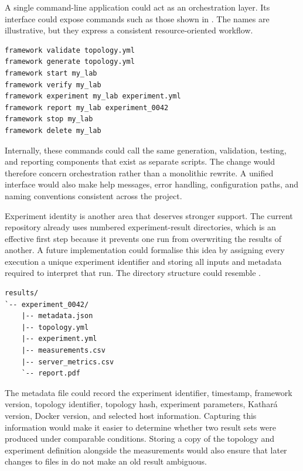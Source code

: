 A single command-line application could act as an orchestration layer. Its
interface could expose commands such as those shown in
. The names are illustrative, but they express a consistent
resource-oriented workflow.

\begin{lstlisting}[language=bash,caption={Conceptual unified command-line interface.},label={lst:future-cli}]
framework validate topology.yml
framework generate topology.yml
framework start my_lab
framework verify my_lab
framework experiment my_lab experiment.yml
framework report my_lab experiment_0042
framework stop my_lab
framework delete my_lab
\end{lstlisting}

Internally, these commands could call the same generation, validation, testing,
and reporting components that exist as separate scripts. The change would
therefore concern orchestration rather than a monolithic rewrite. A unified
interface would also make help messages, error handling, configuration paths,
and naming conventions consistent across the project.

Experiment identity is another area that deserves stronger support. The current
repository already uses numbered experiment-result directories, which is an
effective first step because it prevents one run from overwriting the results
of another.
A future implementation could formalise this idea by assigning every execution
a unique experiment identifier and storing all inputs and metadata required to
interpret that run. The directory structure could resemble
.

\begin{lstlisting}[caption={Possible future experiment output layout.},label={lst:future-results-layout}]
results/
`-- experiment_0042/
    |-- metadata.json
    |-- topology.yml
    |-- experiment.yml
    |-- measurements.csv
    |-- server_metrics.csv
    `-- report.pdf
\end{lstlisting}

The metadata file could record the experiment identifier, timestamp, framework
version, topology identifier, topology hash, experiment parameters, Kathar\'a
version, Docker version, and selected host information. Capturing this
information would make it easier to determine whether two result sets were
produced under comparable conditions. Storing a copy of the topology and
experiment definition alongside the measurements would also ensure that later
changes to files in  do not make an old result ambiguous.

